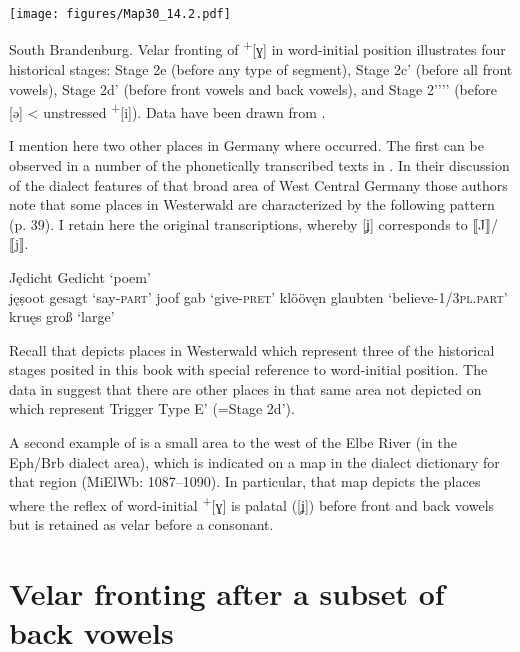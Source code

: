 \begin{map}
\texttt{[image: figures/Map30\_14.2.pdf]}
\caption[{South Brandenburg}]{{South Brandenburg}. Velar fronting of  \textsuperscript{+}[ɣ] in word-initial position illustrates four historical stages:  Stage 2e (before any type of segment), Stage 2c' (before all front vowels), Stage 2d' (before front vowels and back vowels), and Stage 2{}'{}'{}'{}'  (before [ə] < unstressed \textsuperscript{+}[i]). Data have been drawn from \citet{Kieser1963}.}
\label{map:30}
\end{map}

I mention here two other places in Germany where  occurred. The first can be observed in a number of the phonetically transcribed texts in \citet{CornelissenEtAl1989}. In their discussion of the dialect features of that broad area of West Central Germany those authors note that some places in Westerwald are characterized by the following pattern (p. 39). I retain here the original transcriptions, whereby [ʝ] corresponds to ⟦J⟧/⟦j⟧.

\ea\label{ex:14:23}
\ea\label{ex:14:23a} Jędicht \tab Gedicht  \tab ‘poem’\\
    jęṣoot \tab  gesagt  \tab  ‘say-\textsc{part}’
\ex\label{ex:14:23b} joof    \tab gab      \tab ‘give-\textsc{pret}’
\ex\label{ex:14:23c} klöövęn \tab glaubten \tab ‘believe-\textsc{1/3}\textsc{pl}.\textsc{part}’\\
    kruęs   \tab groß     \tab ‘large’
\z 
\z 

Recall that  depicts places in Westerwald which represent three of the historical stages posited in this book with special reference to word-initial position. The data in  suggest that there are other places in that same area not depicted on  which represent Trigger Type E' (=Stage 2d').

A second example of  is a small area to the west of the Elbe River (in the Eph/Brb dialect area), which is indicated on a map in the dialect dictionary for that region (MiElWb: 1087--1090). In particular, that map depicts the places where the reflex of word-initial \textsuperscript{+}[ɣ] is palatal ([ʝ]) before front and back vowels but is retained as velar before a consonant.

\section{{Velar} {fronting} {after} {a} {subset} {of} {back} {vowels}}\label{sec:14.3}

